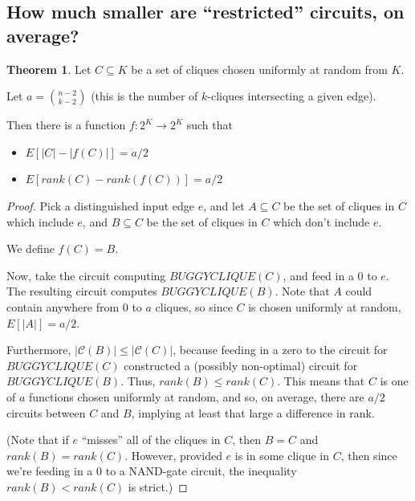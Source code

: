 \documentclass[12pt]{article}
\theoremstyle{definition}
\newtheorem{thm}{Theorem}[section]
\newcommand{\bigC}[0]{\mathcal{C}}
\begin{document}
\subsection{How much smaller are ``restricted'' circuits, on average?}

\begin{thm}
\label{vaguelyUpward}
Let $C \subseteq K$ be a set of cliques chosen uniformly at random
from $K$.

Let $a = {n-2 \choose k-2}$ (this is the number of $k$-cliques
intersecting a given edge).

Then there is a function $f: 2^K \rightarrow 2^K$ such that
\begin{itemize}

\item $E[|C| - |f(C)|] = a/2$

\item $E[rank(C) - rank(f(C))] = a/2$

\end{itemize}

\end{thm}
\begin{proof}

Pick a distinguished input edge $e$, and let $A \subseteq C$ be
the set of cliques in $C$ which include $e$, and $B \subseteq C$ be
the set of cliques in $C$ which don't include $e$.

We define $f(C) = B$.

Now, take the circuit computing $BUGGYCLIQUE(C)$, and
feed in a 0 to $e$. The resulting circuit computes
$BUGGYCLIQUE(B)$. Note that $A$ could contain anywhere
from 0 to $a$
cliques, so since $C$ is chosen uniformly at random,
$E[|A|] = a/2$.

Furthermore, $|\bigC(B)| \le |\bigC(C)|$, because feeding in
a zero to the circuit for $BUGGYCLIQUE(C)$ constructed a
(possibly non-optimal) circuit for $BUGGYCLIQUE(B)$.
Thus, $rank(B) \le rank(C)$.
This means that
$C$ is one of $a$ functions chosen uniformly at random,
and so, on average, there are $a/2$ circuits between $C$
and $B$, implying at least that large a difference in rank.

(Note that if $e$ ``misses'' all of the cliques in $C$, then $B = C$
and $rank(B) = rank(C)$. However, provided $e$ is in some clique in $C$,
then since we're feeding in a 0 to a NAND-gate circuit,
the inequality $rank(B) < rank(C)$ is strict.)

\end{proof}
\end{document}
